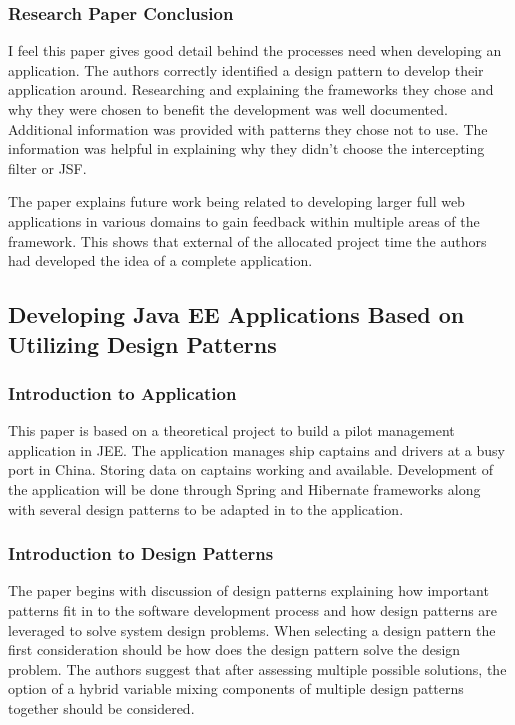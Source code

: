\documentclass{article}
\begin{document}
		\subsubsection{Research Paper Conclusion}
		I feel this paper gives good detail behind the processes need when developing an application. The authors correctly identified a design pattern to develop their application around. Researching and explaining the frameworks they chose and why they were chosen to benefit the development was well documented. Additional information was provided with patterns they chose not to use. The information was helpful in explaining why they didn’t choose the intercepting filter or JSF.
		
		The paper explains future work being related to developing larger full web applications in various domains to gain feedback within multiple areas of the framework. This shows that external of the allocated project time the authors had developed the idea of a complete application.		

	\subsection{Developing Java EE Applications Based on Utilizing Design Patterns}

		\subsubsection{Introduction to Application}
		This paper is based on a theoretical project to build a pilot management application in JEE. The application manages ship captains and drivers at a busy port in China. Storing data on captains working and available. Development of the application will be done through Spring and Hibernate frameworks along with several design patterns to be adapted in to the application.
	
		\subsubsection{Introduction to Design Patterns}
		The paper begins with discussion of design patterns explaining how important patterns fit in to the software development process and how design patterns are leveraged to solve system design problems. When selecting a design pattern the first consideration should be how does the design pattern solve the design problem. The authors suggest that after assessing multiple possible solutions, the option of a hybrid variable mixing components of multiple design patterns together should be considered.
\end{document}
